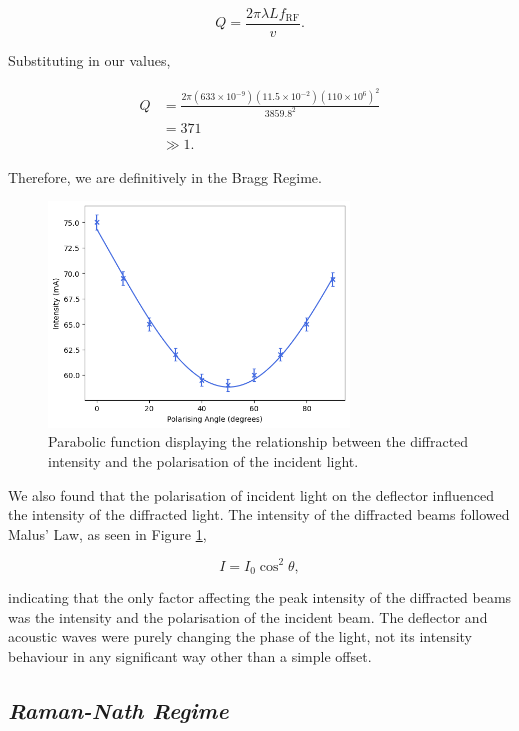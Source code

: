 \documentclass[aps,prl,reprint,10pt,amsmath,amssymb,superscriptaddress,a4paper]{revtex4-2}
\begin{document}
\begin{equation*}
    Q = \frac{2\pi\lambda Lf_{\text{RF}}}{v}.
\end{equation*}

Substituting in our values,

\begin{align*}
    Q &= \frac{2\pi (633\times10^{-9})(11.5\times10^{-2})(110\times10^6)^2}{3859.8^2} \\
    &= 371 \\
    &\gg 1.
\end{align*}

Therefore, we are definitively in the Bragg Regime.

\begin{figure}
    \includegraphics[width = 8cm]{../Figures/polarisation.png}
    \caption{Parabolic function displaying the relationship between the diffracted intensity and the 
    polarisation of the incident light.}
    \label{fig:polarisation}
\end{figure}

We also found that the polarisation of incident light on the deflector influenced the intensity of the diffracted light. The intensity of the diffracted beams followed 
Malus' Law, as seen in Figure \ref{fig:polarisation},

\begin{equation} \label{eqn:malus}
    I = I_0\cos^2{\theta},
\end{equation}

indicating that the only factor affecting the peak intensity of the diffracted beams was the intensity and the polarisation of the incident beam. The deflector and acoustic waves 
were purely changing the phase of the light, not its intensity behaviour in any significant way other than a simple offset.

\subsection{\normalfont\textit{Raman-Nath Regime}}
\end{document}
